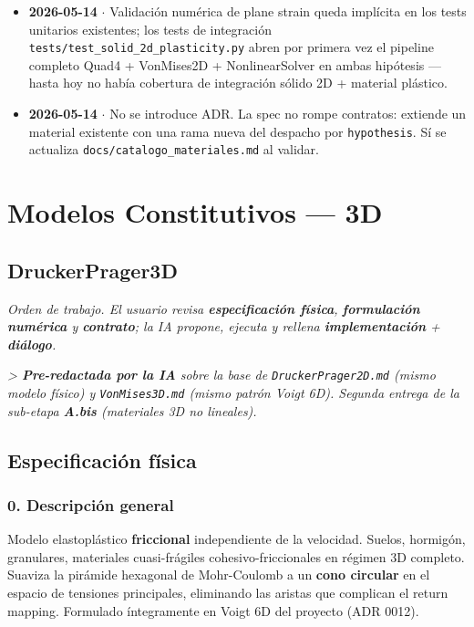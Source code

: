 \documentclass[11pt,letterpaper,oneside]{report}
\begin{document}
\begin{itemize}
  \item \textbf{2026-05-14} \ensuremath{\cdot} Validación numérica de plane strain queda implícita en los tests unitarios existentes; los tests de integración \texttt{tests/test\_solid\_2d\_plasticity.py} abren por primera vez el pipeline completo Quad4 + VonMises2D + NonlinearSolver en ambas hipótesis --- hasta hoy no había cobertura de integración sólido 2D + material plástico.
  \item \textbf{2026-05-14} \ensuremath{\cdot} No se introduce ADR. La spec no rompe contratos: extiende un material existente con una rama nueva del despacho por \texttt{hypothesis}. Sí se actualiza \texttt{docs/catalogo\_materiales.md} al validar.
\end{itemize}


\newpage

\chapter{Modelos Constitutivos — 3D}

\section{DruckerPrager3D}



\textit{Orden de trabajo. El usuario revisa \textbf{especificación física}, \textbf{formulación numérica} y \textbf{contrato}; la IA propone, ejecuta y rellena \textbf{implementación} + \textbf{diálogo}.}

\textit{> \textbf{Pre-redactada por la IA} sobre la base de \texttt{DruckerPrager2D.md} (mismo modelo físico) y \texttt{VonMises3D.md} (mismo patrón Voigt 6D). Segunda entrega de la sub-etapa \textbf{A.bis} (materiales 3D no lineales).}



\section{Especificación física}

\subsection{0. Descripción general}

Modelo elastoplástico \textbf{friccional} independiente de la velocidad. Suelos, hormigón, granulares, materiales cuasi-frágiles cohesivo-friccionales en régimen 3D completo. Suaviza la pirámide hexagonal de Mohr-Coulomb a un \textbf{cono circular} en el espacio de tensiones principales, eliminando las aristas que complican el return mapping. Formulado íntegramente en Voigt 6D del proyecto (ADR 0012).
\end{document}
